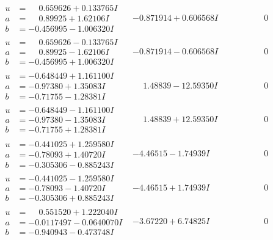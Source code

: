 \documentclass[1p]{elsarticle_modified}
\theoremstyle{definition}
\begin{document}
$$\begin{array}{c|c|c}
\begin{aligned}
u &= \phantom{-}0.659626 + 0.133765 I \\
a &= \phantom{-}0.89925 + 1.62106 I \\
b &= -0.456995 - 1.006320 I\end{aligned}
 & -0.871914 + 0.606568 I & \phantom{-0.000000 } 0 \\ \hline\begin{aligned}
u &= \phantom{-}0.659626 - 0.133765 I \\
a &= \phantom{-}0.89925 - 1.62106 I \\
b &= -0.456995 + 1.006320 I\end{aligned}
 & -0.871914 - 0.606568 I & \phantom{-0.000000 } 0 \\ \hline\begin{aligned}
u &= -0.648449 + 1.161100 I \\
a &= -0.97380 + 1.35083 I \\
b &= -0.71755 - 1.28381 I\end{aligned}
 & \phantom{-}1.48839 - 12.59350 I & \phantom{-0.000000 } 0 \\ \hline\begin{aligned}
u &= -0.648449 - 1.161100 I \\
a &= -0.97380 - 1.35083 I \\
b &= -0.71755 + 1.28381 I\end{aligned}
 & \phantom{-}1.48839 + 12.59350 I & \phantom{-0.000000 } 0 \\ \hline\begin{aligned}
u &= -0.441025 + 1.259580 I \\
a &= -0.78093 + 1.40720 I \\
b &= -0.305306 - 0.885243 I\end{aligned}
 & -4.46515 - 1.74939 I & \phantom{-0.000000 } 0 \\ \hline\begin{aligned}
u &= -0.441025 - 1.259580 I \\
a &= -0.78093 - 1.40720 I \\
b &= -0.305306 + 0.885243 I\end{aligned}
 & -4.46515 + 1.74939 I & \phantom{-0.000000 } 0 \\ \hline\begin{aligned}
u &= \phantom{-}0.551520 + 1.222040 I \\
a &= -0.0117497 - 0.0640070 I \\
b &= -0.940943 - 0.473748 I\end{aligned}
 & -3.67220 + 6.74825 I & \phantom{-0.000000 } 0 \\ \hline\begin{aligned}

\end{aligned}
\end{array}$$
\end{document}
